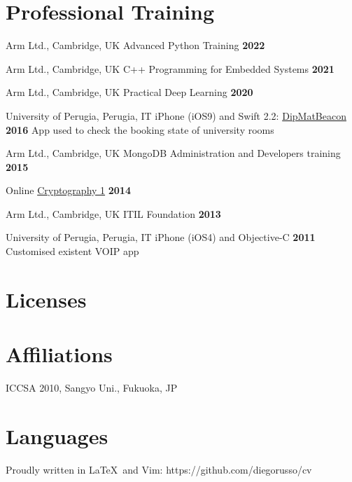 \documentclass[10pt,a4paper,sans]{moderncv}
\begin{document}
\section{Professional Training}

    {Arm Ltd., Cambridge, UK}
    {Advanced Python Training}
    {\textbf{2022}}
    {}
    {}

    {Arm Ltd., Cambridge, UK}
    {C++ Programming for Embedded Systems}
    {\textbf{2021}}
    {}
    {}

    {Arm Ltd., Cambridge, UK}
    {Practical Deep Learning}
    {\textbf{2020}}
    {}
    {}

    {University of Perugia, Perugia, IT}
    {iPhone (iOS9) and Swift 2.2:
        \href{https://github.com/diegorusso/DipMatBeacon}{DipMatBeacon}}
    {\textbf{2016}}
    {App used to check the booking state of university rooms}
    {}

    {Arm Ltd., Cambridge, UK}
    {MongoDB Administration and Developers training}
    {\textbf{2015}}
    {}
    {}

    {Online}
    {\href{http://bit.ly/coursera-crypto1}{Cryptography 1}}
    {\textbf{2014}}
    {}
    {}

    {Arm Ltd., Cambridge, UK}
    {ITIL Foundation}
    {\textbf{2013}}
    {}
    {}

\cventry{}
    {University of Perugia, Perugia, IT}
    {iPhone (iOS4) and Objective-C}
    {\textbf{2011}}
    {Customised existent VOIP app}
    {}

\section{Licenses}


\section{Affiliations}
        {ICCSA 2010, Sangyo Uni., Fukuoka, JP}

\section{Languages}

\begin{center}
Proudly written in \LaTeX\ and Vim: https://github.com/diegorusso/cv
\end{center}
\end{document}
